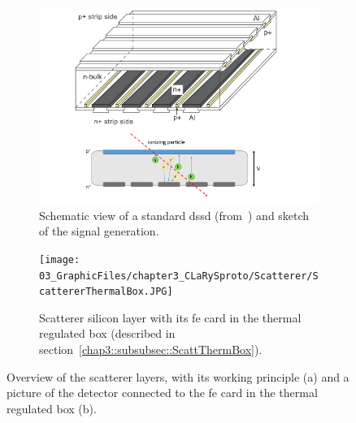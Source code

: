 \begin{figure}
\begin{subfigure}[t]{.5\textwidth}
\centering
\includegraphics[width=1\textwidth]{03_GraphicFiles/chapter3_CLaRySproto/Scatterer/DSSD_theory_1.pdf}
\caption{Schematic view of a standard \gls{dssd} (from~\cite{Takeda2008}) and sketch of the signal generation.}
\label{chap3::fig::dssdTHEO}
\end{subfigure}
\begin{subfigure}[t]{.5\textwidth}
\centering
\texttt{[image: 03\_GraphicFiles/chapter3\_CLaRySproto/Scatterer/ScattererThermalBox.JPG]}
\caption{Scatterer silicon layer with its \gls{fe} card in the thermal regulated box (described in section~\ref{chap3::subsubsec::ScattThermBox}).}
\label{chap3::fig::ScattPicture}
\end{subfigure}
\caption{Overview of the scatterer layers, with its working principle (a) and a picture of the detector connected to the \gls{fe} card in the thermal regulated box (b).}
\label{chap3::fig::scatterer}
\end{figure} 

